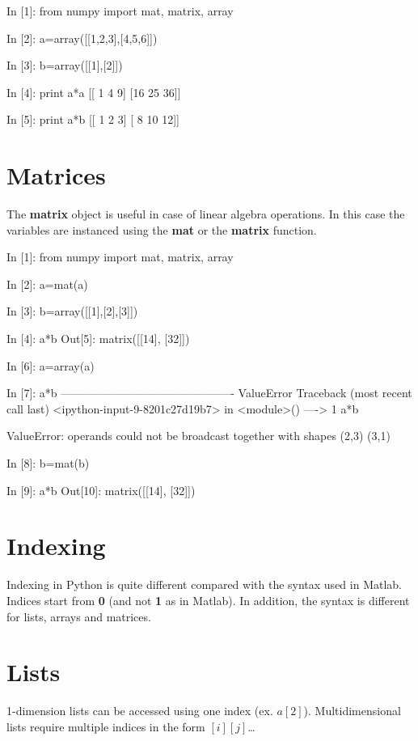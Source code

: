 \begin{code}
In [1]: from numpy import mat, matrix, array

In [2]: a=array([[1,2,3],[4,5,6]])

In [3]: b=array([[1],[2]])

In [4]: print a*a
[[ 1  4  9]
 [16 25 36]]

In [5]: print a*b
[[ 1  2  3]
 [ 8 10 12]]
\end{code}

\section{Matrices}
The \textbf{matrix} object is useful in case of linear algebra operations.
In this case the variables are instanced using the \textbf{mat} or the
\textbf{matrix} function.

\begin{code}
In [1]: from numpy import mat, matrix, array

In [2]: a=mat(a)

In [3]: b=array([[1],[2],[3]])

In [4]: a*b
Out[5]: 
matrix([[14],
        [32]])

In [6]: a=array(a)
\end{code}

\begin{code}
In [7]: a*b
----------------------------------------------
ValueError			Traceback (most recent call last)
<ipython-input-9-8201c27d19b7> in <module>()
----> 1 a*b

ValueError: operands could not be broadcast together with shapes (2,3) (3,1) 

In [8]: b=mat(b)

In [9]: a*b
Out[10]: 
matrix([[14],
        [32]])
\end{code}

\section{Indexing}
Indexing in Python is quite different compared with the syntax used in Matlab.
Indices start from \textbf{0} (and not \textbf{1} as in Matlab).
In addition, the syntax is different for lists, arrays and matrices.

\section{Lists}
1-dimension lists can be accessed using one index (ex. $a[2]$). Multidimensional
lists require multiple indices in the form $[i][j]$\ldots

